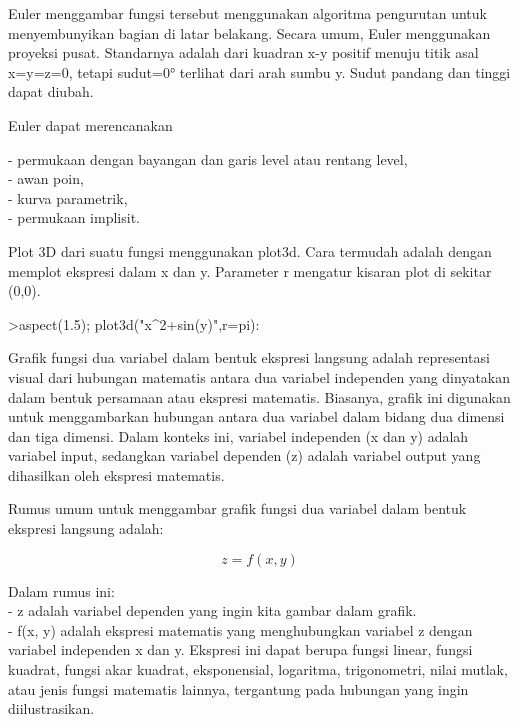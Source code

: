 \documentclass[a4paper,10pt]{article}
\begin{document}
\begin{eulernotebook}
\begin{eulercomment}
\begin{eulercomment}
\begin{eulercomment}
\begin{eulercomment}
\begin{eulercomment}
\begin{eulercomment}
\begin{eulercomment}
\begin{eulercomment}
\begin{eulercomment}
\begin{eulercomment}
\begin{eulercomment}
\begin{eulercomment}
\begin{eulercomment}
Euler menggambar fungsi tersebut menggunakan algoritma pengurutan
untuk menyembunyikan bagian di latar belakang. Secara umum, Euler
menggunakan proyeksi pusat. Standarnya adalah dari kuadran x-y positif
menuju titik asal x=y=z=0, tetapi sudut=0° terlihat dari arah sumbu y.
Sudut pandang dan tinggi dapat diubah.

Euler dapat merencanakan

- permukaan dengan bayangan dan garis level atau rentang level,\\
- awan poin,\\
- kurva parametrik,\\
- permukaan implisit.

Plot 3D dari suatu fungsi menggunakan plot3d. Cara termudah adalah
dengan memplot ekspresi dalam x dan y. Parameter r mengatur kisaran
plot di sekitar (0,0).
\end{eulercomment}
\begin{eulerprompt}
>aspect(1.5); plot3d("x^2+sin(y)",r=pi): 
\end{eulerprompt}
\begin{eulercomment}
Grafik fungsi dua variabel dalam bentuk ekspresi langsung adalah
representasi visual dari hubungan matematis antara dua variabel
independen yang dinyatakan dalam bentuk persamaan atau ekspresi
matematis. Biasanya, grafik ini digunakan untuk menggambarkan hubungan
antara dua variabel dalam bidang dua dimensi dan tiga dimensi. Dalam
konteks ini, variabel independen (x dan y) adalah variabel input,
sedangkan variabel dependen (z) adalah variabel output yang dihasilkan
oleh ekspresi matematis.

Rumus umum untuk menggambar grafik fungsi dua variabel dalam bentuk
ekspresi langsung adalah:\\
\end{eulercomment}
\begin{eulerformula}
\[
z = f(x, y)
\]
\end{eulerformula}
\begin{eulercomment}
Dalam rumus ini:\\
- z adalah variabel dependen yang ingin kita gambar dalam grafik.\\
- f(x, y) adalah ekspresi matematis yang menghubungkan variabel z
dengan variabel independen x dan y. Ekspresi ini dapat berupa fungsi
linear, fungsi kuadrat, fungsi akar kuadrat, eksponensial, logaritma,
trigonometri, nilai mutlak, atau jenis fungsi matematis lainnya,
tergantung pada hubungan yang ingin diilustrasikan.


\end{eulercomment}
\end{eulercomment}
\end{eulercomment}
\end{eulercomment}
\end{eulercomment}
\end{eulercomment}
\end{eulercomment}
\end{eulercomment}
\end{eulercomment}
\end{eulercomment}
\end{eulercomment}
\end{eulercomment}
\end{eulercomment}
\end{eulernotebook}
\end{document}
